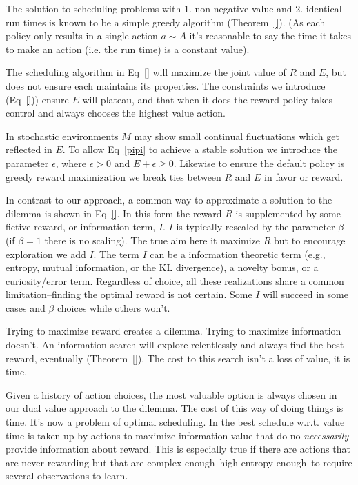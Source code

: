 \documentclass[9pt,twocolumn,twoside]{pnas-new}
\begin{document}
The solution to scheduling problems with 1. non-negative value and 2. identical run times is known to be a simple greedy algorithm (Theorem~\ref{}). (As each policy only results in a single action $a \sim A$ it's reasonable to say the time it takes to make an action (i.e. the run time) is a constant value).


The scheduling algorithm in Eq~\ref{} will maximize the joint value of $R$ and $E$, but does not ensure each maintains its properties. The constraints we introduce (Eq~\ref{})) ensure $E$ will plateau, and that when it does the reward policy takes control and always chooses the highest value action. 

In stochastic environments $M$ may show small continual fluctuations which get reflected in $E$. To allow Eq~\ref{pipi} to achieve a stable solution we introduce the parameter $\epsilon$, where $\epsilon > 0$ and $E + \epsilon \geq 0$. Likewise to ensure the default policy is greedy reward maximization we break ties between $R$ and $E$ in favor or reward.

In contrast to our approach, a common way to approximate a solution to the dilemma is shown in Eq~\ref{}. In this form the reward $R$ is supplemented by some fictive reward, or information term, $I$. $I$ is typically rescaled by the parameter $\beta$ (if $\beta = 1$ there is no scaling). The true aim here it maximize $R$ but to encourage exploration we add $I$. The term $I$ can be a information theoretic term (e.g., entropy, mutual information, or the KL divergence), a novelty bonus, or a curiosity/error term. Regardless of choice, all these realizations share a common limitation--finding the optimal reward is not certain. Some $I$ will succeed in some cases and $\beta$ choices while others won't. 

Trying to maximize reward creates a dilemma. Trying to maximize information doesn't. An information search will explore relentlessly and always find the best reward, eventually (Theorem~\ref{}). The cost to this search isn't a loss of value, it is time.  

Given a history of action choices, the most valuable option is always chosen in our dual value approach to the dilemma. The cost of this way of doing things is time. It's now a problem of optimal scheduling. In the best schedule w.r.t. value time is taken up by actions to maximize information value that do no \textit{necessarily} provide information about reward. This is especially true if there are actions that are never rewarding but that are complex enough--high entropy enough--to require several observations to learn. 
\end{document}
